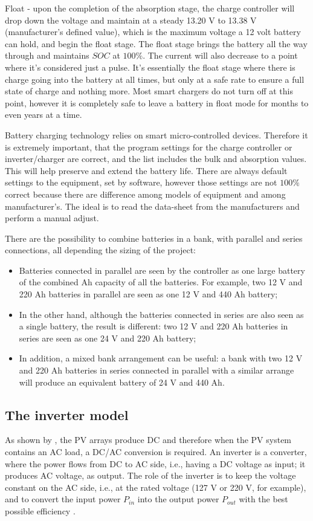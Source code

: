 \documentclass[journal]{IEEEtran}
\begin{document}
Float - upon the completion of the absorption stage, the charge controller will  drop down the voltage and maintain at a steady 13.20 V to 13.38 V (manufacturer's defined value), which is the maximum voltage a 12 volt battery can hold, and begin the float stage. The float stage brings the battery all the way through and maintains $SOC$ at $100\%$. The current will also decrease to a point where it's considered just a pulse. It's essentially the float stage where there is charge going into the battery at all times, but only at a safe rate to ensure a full state of charge and nothing more. Most smart chargers do not turn off at this point, however it is completely safe to leave a battery in float mode for months to even years at a time.

Battery charging technology relies on smart micro-controlled devices. Therefore it is extremely important, that the program settings for the charge controller or inverter/charger are correct, and the list includes the bulk and absorption values. This will help preserve and extend the battery life. There are always default settings to the equipment, set by software, however those settings are not $100\%$ correct because there are difference among models of equipment and among manufacturer's. The ideal is to read the data-sheet from the manufacturers and perform a manual adjust.

There are the possibility to combine batteries in a bank, with parallel and series connections, all depending the sizing of the project:

\begin{itemize}
\item Batteries connected in parallel are seen by the controller as one large battery of the combined Ah capacity of all the batteries. For example, two 12 V and 220 Ah batteries in parallel are seen as one 12 V and 440 Ah battery;
\item In the other hand, although the batteries connected in series are also seen as a single battery, the result is different: two 12 V and 220 Ah batteries in series are seen as one 24 V and 220 Ah battery;
\item In addition, a mixed bank arrangement can be useful: a bank with two 12 V and 220 Ah batteries in series connected in parallel with a similar arrange will produce an equivalent battery of 24 V and 440 Ah.
\end{itemize}


\subsection{The inverter model}
As shown by \cite{Mellit}, the PV arrays produce DC and therefore when the PV system contains an AC load, a DC/AC conversion is required. An inverter is a converter, where the power flows from DC to AC side, i.e., having a DC voltage as input; it produces AC voltage, as output. The role of the inverter is to keep the voltage constant on the AC side, i.e., at the rated voltage (127 V or 220 V, for example), and to convert the input power $ P_{in} $ into the output power $ P_{out} $ with the best possible efficiency \cite{Hansen}.
\end{document}
